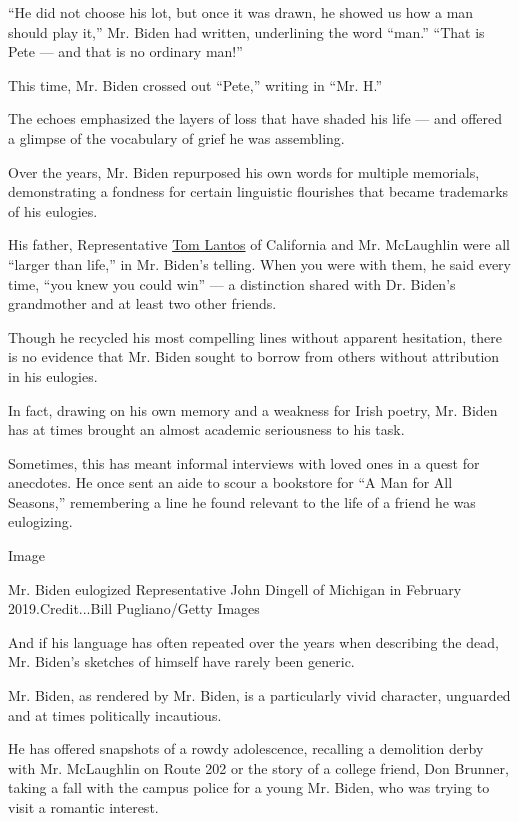 ``He did not choose his lot, but once it was drawn, he showed us how a
man should play it,'' Mr. Biden had written, underlining the word
``man.'' ``That is Pete --- and that is no ordinary man!''

This time, Mr. Biden crossed out ``Pete,'' writing in ``Mr. H.''

The echoes emphasized the layers of loss that have shaded his life ---
and offered a glimpse of the vocabulary of grief he was assembling.

Over the years, Mr. Biden repurposed his own words for multiple
memorials, demonstrating a fondness for certain linguistic flourishes
that became trademarks of his eulogies.

His father, Representative
\href{https://www.nytimes.com/2008/02/12/washington/12lantos.html}{Tom
Lantos} of California and Mr. McLaughlin were all ``larger than life,''
in Mr. Biden's telling. When you were with them, he said every time,
``you knew you could win'' --- a distinction shared with Dr. Biden's
grandmother and at least two other friends.

Though he recycled his most compelling lines without apparent
hesitation, there is no evidence that Mr. Biden sought to borrow from
others without attribution in his eulogies.

In fact, drawing on his own memory and a weakness for Irish poetry, Mr.
Biden has at times brought an almost academic seriousness to his task.

Sometimes, this has meant informal interviews with loved ones in a quest
for anecdotes. He once sent an aide to scour a bookstore for ``A Man for
All Seasons,'' remembering a line he found relevant to the life of a
friend he was eulogizing.

Image

Mr. Biden eulogized Representative John Dingell of Michigan in February
2019.Credit...Bill Pugliano/Getty Images

And if his language has often repeated over the years when describing
the dead, Mr. Biden's sketches of himself have rarely been generic.

Mr. Biden, as rendered by Mr. Biden, is a particularly vivid character,
unguarded and at times politically incautious.

He has offered snapshots of a rowdy adolescence, recalling a demolition
derby with Mr. McLaughlin on Route 202 or the story of a college friend,
Don Brunner, taking a fall with the campus police for a young Mr. Biden,
who was trying to visit a romantic interest.

